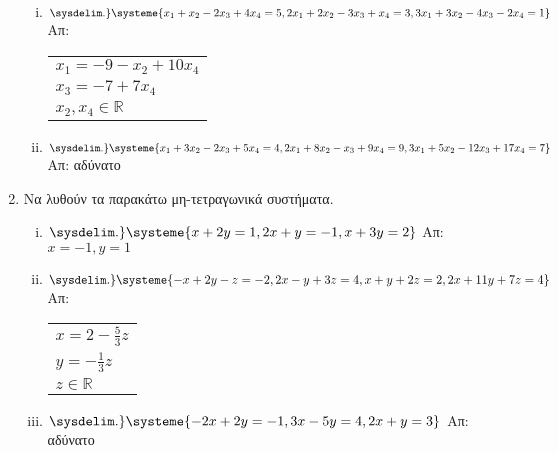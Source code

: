 \documentclass[a4paper,table]{report}
\begin{document}
\begin{enumerate}
\begin{enumerate}[i)]
    \item $ 
    \sysdelim.\}
    \systeme{
      x_{1}+ x_{2}-2 x_{3}+4 x_{4}=5,
      2 x_{1}+ 2 x_{2}-3 x_{3}+ x_{4}=3, 
      3 x_{1}+3 x_{2}-4 x_{3}-2 x_{4}=1
    } $ 
    \hfill Απ: \begin{tabular}{l}
      $ x_{1}=-9- x_{2}+10 x_{4} $ \\
      $ x_{3}= -7+7 x_{4} $ \\ 
      $ x_{2}, x_{4} \in \mathbb{R} $  
    \end{tabular}

  \item $ 
  \sysdelim.\}
  \systeme{
    x_{1}+3 x_{2}-2 x_{3}+5 x_{4}=4,
    2 x_{1}+8 x_{2}- x_{3}+9 x_{4}=9,
    3 x_{1}+5 x_{2}-12 x_{3}+17 x_{4}=7
  } $ 
  \hfill Απ: αδύνατο 
    \end{enumerate}

  \item Να λυθούν τα παρακάτω μη-τετραγωνικά συστήματα.

    \begin{enumerate}[i)]
      \item $ 
      \sysdelim.\}
      \systeme{
        x+2y=1,
        2x+y=-1,
        x+3 y=2 
      } $ 
      \hfill Απ: $ x=-1, y=1 $ 

    \item $ 
    \sysdelim.\}
    \systeme{
      -x+2 y-z=-2,
      2x-y+3z=4,
      x+y+2z=2,
      2x+11y+7z=4
    } $ 
    \hfill Απ:\begin{tabular}{l} 
      $ x=2- \frac{5}{3} z $ \\ 
      $ y = - \frac{1}{3} z $ \\ 
      $ z \in \mathbb{R} $
    \end{tabular}

  \item $ 
  \sysdelim.\}
  \systeme{
    -2x+2y=-1,
    3x-5y=4,
    2x+y=3
  } $ 
  \hfill Απ: αδύνατο 

    \end{enumerate}

\end{enumerate}
\end{document}
